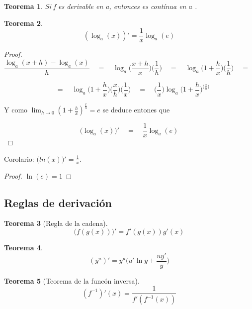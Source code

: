 \documentclass[12pt,a4paper]{extarticle}
\newtheorem{theorem}{Teorema}[section]
\begin{document}
\begin{theorem}
Si f es derivable en a, entonces es cont\'inua en \( a \) .
\end{theorem}

\begin{theorem}
\[ (\log_a(x))' = \frac{1}{x}\log_a(e) \]
\end{theorem}
\begin{proof}

\[ \frac{\log_a(x+h)-\log_a(x)}{h} \quad = \quad
\log_a\Big(\frac{x+h}{x}\Big)\Big(\frac{1}{h}\Big) \quad = \quad
\log_a\Big(1+\frac{h}{x}\Big)\Big(\frac{1}{h}\Big) \quad = \quad
 \]


\[  \quad = \quad \log_a\Big(1+\frac{h}{x}\Big)\Big(\frac{x}{h}\Big)\Big(\frac{1}{x}\Big)
 \quad = \quad
 \Big(\frac{1}{x}\Big)\log_a\Big(1+\frac{h}{x}\Big)^{\Big(\frac{x}{h}\Big)} \]

Y como \( \lim_{h \to 0}(1+\frac{h}{x})^{\frac{x}{h}}  =  e \) se
deduce entones que


\[ \Big(\log_a(x)\Big)' \quad = \quad \frac{1}{x} \log_a(e) \]
\end{proof}
Corolario: \( \Big( ln(x) \Big)' = \frac{1}{x}.  \)
\begin{proof}
\( \ln(e)=1 \)
\end{proof}

\subsection{Reglas de derivaci\'on}

\begin{theorem}[Regla de la cadena]
\begin{equation}
\Big(f(g(x))\Big)' = f'(g(x))g'(x)
\end{equation}
\end{theorem}

\begin{theorem}
\[(y^u)'=y^u\Big(u'\ln y+\frac{uy'}{y}\Big)\]
\end{theorem}

\begin{theorem}[Teorema de la func\'on inversa]
\[(f^{-1})'(x) = \frac{1}{f'(f^{-1}(x))}\]
\end{theorem}
\end{document}
